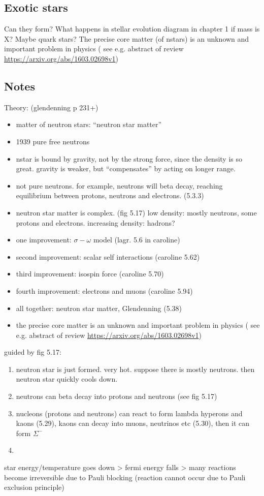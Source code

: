 \subsection{Exotic stars}

Can they form? What happens in stellar evolution diagram in chapter 1 if mass is X? Maybe quark stars?
The precise core matter (of nstars) is an unknown and important problem in physics ( see e.g. abstract of review \url{https://arxiv.org/abs/1603.02698v1})

\subsection*{Notes}

Theory: (glendenning p 231+)

\begin{itemize}
\item matter of neutron stars: ``neutron star matter''
\item 1939 pure free neutrons
\item nstar is bound by gravity, not by the strong force, since the density is so great. gravity is weaker, but ``compensates'' by acting on longer range.
\item not pure neutrons. for example, neutrons will beta decay, reaching equilibrium between protons, neutrons and electrons. (5.3.3)
\item neutron star matter is complex. (fig 5.17) low density: mostly neutrons, some protons and electrons. increasing density: hadrons?
\item one improvement: $\sigma-\omega$ model (lagr. 5.6 in caroline)
\item second improvement: scalar self interactions (caroline 5.62)
\item third improvement: isospin force (caroline 5.70)
\item fourth improvement: electrons and muons (caroline 5.94)
\item all together: neutron star matter, Glendenning (5.38)
\item the precise core matter is an unknown and important problem in physics ( see e.g. abstract of review \url{https://arxiv.org/abs/1603.02698v1})
\end{itemize}

guided by fig 5.17:
\begin{enumerate}
\item neutron star is just formed. very hot. suppose there is mostly neutrons. then neutron star quickly cools down.
\item neutrons can beta decay into protons and neutrons (see fig 5.17)
\item nucleons (protons and neutrons) can react to form lambda hyperons and kaons (5.29), kaons can decay into muons, neutrinos etc (5.30), then it can form $\Sigma^-$
\item 
\end{enumerate}
star energy/temperature goes down > fermi energy falls > many reactions become irreversible due to Pauli blocking (reaction cannot occur due to Pauli exclusion principle)
